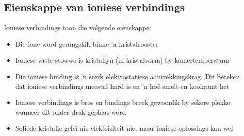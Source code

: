             \subsection*{Eienskappe van ioniese verbindings}
            \nopagebreak
Ioniese verbindings toon die volgende eienskappe:
        \label{m38684*id142815}\begin{itemize}[noitemsep]
            \label{m38684*uid72}\item Die ione word gerangskik binne 'n kristalrooster
\label{m38684*uid73}\item Ioniese vaste stowwe is kristallyn (in kristalvorm) by kamertemperatuur
\label{m38684*uid74}\item Die ioniese binding is 'n sterk elektrostatiese aantrekkingskrag. Dit beteken dat ioniese verbindings meestal hard is en 'n ho\"{e} smelt-en kookpunt het
\label{m38684*uid75}\item Ioniese verbindings is bros en bindings breek gewoonlik by sekere plekke wanneer dit onder druk geplaas word
\label{m38684*uid76}\item Soliede kristalle gelei nie elektrisiteit nie, maar ioniese oplossings kan wel
\end{itemize}
\label{m38684*secfhsst!!!underscore!!!id522}
